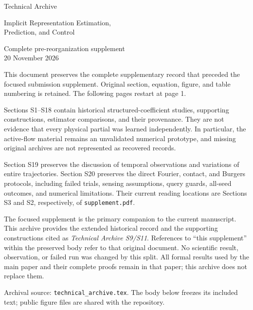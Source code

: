 \documentclass[journal]{IEEEtran}
\begin{document}
\begin{titlepage}
\centering
\vspace*{1.0in}
{\LARGE Technical Archive\par}
\vspace{.3in}
{\Large Implicit Representation Estimation,\\Prediction, and Control\par}
\vspace{.4in}
{\large Complete pre-reorganization supplement\\20 November 2026\par}
\vspace{.45in}
\begin{minipage}{.84\textwidth}
This document preserves the complete supplementary record that preceded the
focused submission supplement. Original section, equation, figure, and table
numbering is retained. The following pages restart at page 1.

\medskip
Sections S1--S18 contain historical structured-coefficient studies, supporting
constructions, estimator comparisons, and their provenance. They are not
evidence that every physical partial was learned independently. In particular,
the active-flow material remains an unvalidated numerical prototype, and
missing original archives are not represented as recovered records.

\medskip
Section S19 preserves the discussion of temporal observations and variations
of entire trajectories. Section S20 preserves the direct Fourier, contact,
and Burgers protocols, including failed trials, sensing assumptions, query
guards, all-seed outcomes, and numerical limitations. Their current reading
locations are Sections S3 and S2, respectively, of \texttt{supplement.pdf}.

\medskip
The focused supplement is the primary companion to the current manuscript.
This archive provides the extended historical record and the supporting
constructions cited as \emph{Technical Archive S9/S11}. References to ``this
supplement'' within the preserved body refer to that original document.
No scientific result, observation, or failed run was changed by this split.
All formal results used by the main paper and their complete proofs remain
in that paper; this archive does not replace them.
\end{minipage}
\vfill
{\small Archival source: \texttt{technical\_archive.tex}. The body below freezes
its included text; public figure files are shared with the repository.\par}
\end{titlepage}
\setcounter{page}{1}
\end{document}
